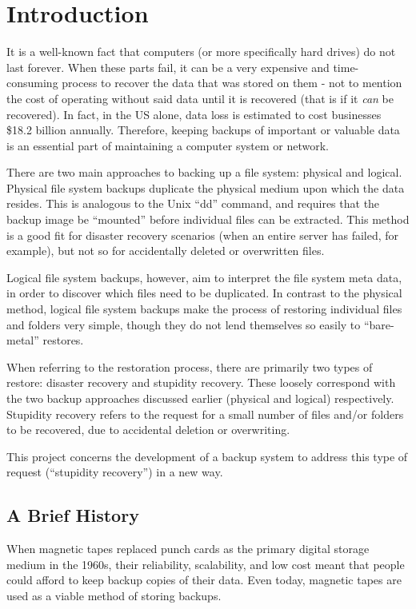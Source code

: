 \chapter{Introduction}

It is a well-known fact that computers (or more specifically hard drives) do
not last forever. When these parts fail, it can be a very expensive and
time-consuming process to recover the data that was stored on them - not to
mention the cost of operating without said data until it is recovered (that is
if it \emph{can} be recovered). In fact, in the US alone, data loss is
estimated to cost businesses \$18.2 billion annually\cite{smith03}. Therefore,
keeping backups of important or valuable data is an essential part of
maintaining a computer system or network.

There are two main approaches to backing up a file system: physical and
logical\cite{hutchinson99}. Physical file system backups duplicate the physical
medium upon which the data resides. This is analogous to the Unix ``dd''
command, and requires that the backup image be ``mounted'' before individual
files can be extracted. This method is a good fit for disaster recovery
scenarios (when an entire server has failed, for example), but not so for
accidentally deleted or overwritten files.

Logical file system backups, however, aim to interpret the file system meta
data, in order to discover which files need to be duplicated.  In contrast to
the physical method, logical file system backups make the process of restoring
individual files and folders very simple, though they do not lend themselves so
easily to ``bare-metal'' restores.

When referring to the restoration process, there are primarily two types of
restore: disaster recovery and stupidity recovery\cite{hutchinson99}. These
loosely correspond with the two backup approaches discussed earlier (physical
and logical) respectively. Stupidity recovery refers to the request for a small
number of files and/or folders to be recovered, due to accidental deletion or
overwriting.

This project concerns the development of a backup system to address this type
of request (``stupidity recovery'') in a new way.

\section{A Brief History}

When magnetic tapes replaced punch cards as the primary digital storage medium
in the 1960s, their reliability, scalability, and low cost meant that people
could afford to keep backup copies of their data. Even today, magnetic tapes
are used as a viable method of storing backups.

